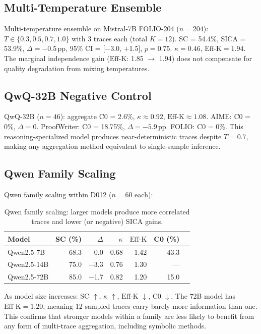 \documentclass[11pt,a4paper]{article}
\newcommand{\effk}{\text{Eff-K}}
\begin{document}
\subsection{Multi-Temperature Ensemble}

Multi-temperature ensemble on Mistral-7B FOLIO-204 ($n=204$): $T \in \{0.3, 0.5, 0.7, 1.0\}$ with 3 traces each (total $K=12$). SC = 54.4\%, SICA = 53.9\%, $\Delta = -0.5$\,pp, 95\% CI = [$-$3.0, $+$1.5], $p = 0.75$. $\kappa = 0.46$, $\effk = 1.94$. The marginal independence gain ($\effk$: 1.85 $\to$ 1.94) does not compensate for quality degradation from mixing temperatures.

\subsection{QwQ-32B Negative Control}

QwQ-32B ($n=46$): aggregate C0 = 2.6\%, $\kappa \approx 0.92$, $\effk \approx 1.08$. AIME: C0 = 0\%, $\Delta = 0$. ProofWriter: C0 = 18.75\%, $\Delta = -5.9$\,pp. FOLIO: C0 = 0\%. This reasoning-specialized model produces near-deterministic traces despite $T=0.7$, making any aggregation method equivalent to single-sample inference.

\subsection{Qwen Family Scaling}

Qwen family scaling within D012 ($n=60$ each):

\begin{table}[h]
\centering
\caption{Qwen family scaling: larger models produce more correlated traces and lower (or negative) SICA gains.}
\label{tab:qwen_scaling}
\small
\begin{tabular}{lrrrrrr}
\toprule
\textbf{Model} & \textbf{SC (\%)} & \textbf{$\Delta$} & \textbf{$\kappa$} & \textbf{$\effk$} & \textbf{C0 (\%)} \\
\midrule
Qwen2.5-7B  & 68.3 & 0.0    & 0.68 & 1.42 & 43.3 \\
Qwen2.5-14B & 75.0 & $-$3.3 & 0.76 & 1.30 & --- \\
Qwen2.5-72B & 85.0 & $-$1.7 & 0.82 & 1.20 & 15.0 \\
\bottomrule
\end{tabular}
\end{table}

As model size increases: SC $\uparrow$, $\kappa$ $\uparrow$, $\effk$ $\downarrow$, C0 $\downarrow$. The 72B model has $\effk = 1.20$, meaning 12 sampled traces carry barely more information than one. This confirms that stronger models within a family are less likely to benefit from any form of multi-trace aggregation, including symbolic methods.
\end{document}
